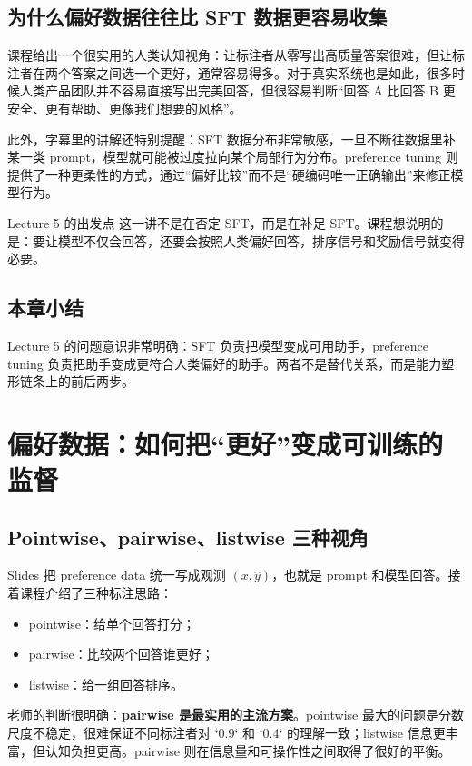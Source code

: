 \documentclass[a4paper]{article}
\begin{document}
\subsection{为什么偏好数据往往比 SFT 数据更容易收集}
课程给出一个很实用的人类认知视角：让标注者从零写出高质量答案很难，但让标注者在两个答案之间选一个更好，通常容易得多。对于真实系统也是如此，很多时候人类产品团队并不容易直接写出完美回答，但很容易判断“回答 A 比回答 B 更安全、更有帮助、更像我们想要的风格”。

此外，字幕里的讲解还特别提醒：SFT 数据分布非常敏感，一旦不断往数据里补某一类 prompt，模型就可能被过度拉向某个局部行为分布。preference tuning 则提供了一种更柔性的方式，通过“偏好比较”而不是“硬编码唯一正确输出”来修正模型行为。

\begin{importantbox}{Lecture 5 的出发点}
这一讲不是在否定 SFT，而是在补足 SFT。课程想说明的是：要让模型不仅会回答，还要会按照人类偏好回答，排序信号和奖励信号就变得必要。
\end{importantbox}

\subsection{本章小结}
Lecture 5 的问题意识非常明确：SFT 负责把模型变成可用助手，preference tuning 负责把助手变成更符合人类偏好的助手。两者不是替代关系，而是能力塑形链条上的前后两步。

\section{偏好数据：如何把“更好”变成可训练的监督}

\subsection{Pointwise、pairwise、listwise 三种视角}
Slides 把 preference data 统一写成观测 $(x, \hat{y})$，也就是 prompt 和模型回答。接着课程介绍了三种标注思路：
\begin{itemize}
\item pointwise：给单个回答打分；
\item pairwise：比较两个回答谁更好；
\item listwise：给一组回答排序。
\end{itemize}
老师的判断很明确：\textbf{pairwise 是最实用的主流方案}。pointwise 最大的问题是分数尺度不稳定，很难保证不同标注者对 `0.9` 和 `0.4` 的理解一致；listwise 信息更丰富，但认知负担更高。pairwise 则在信息量和可操作性之间取得了很好的平衡。
\end{document}
